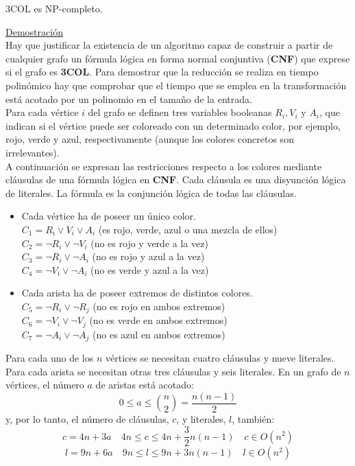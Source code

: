 \begin{fondo}
3COL es NP-completo.
\end{fondo}

\underline{Demostración}\\

Hay que justificar la existencia de un algoritmo capaz de construir a partir de cualquier grafo un fórmula lógica en forma normal conjuntiva (\textbf{CNF}) que exprese si el grafo es \textbf{3COL}. Para demostrar que la reducción se realiza en tiempo polinómico hay que comprobar que el tiempo que se emplea en la transformación está acotado por un polinomio en el tamaño de la entrada.\\

Para cada vértice $i$ del grafo se definen tres variables booleanas $R_i, V_i$ y $A_i$, que indican si el vértice puede ser coloreado con un determinado color, por ejemplo, rojo, verde y azul, respectivamente (aunque los colores concretos son irrelevantes).\\

A continuación se expresan las restricciones respecto a los colores mediante cláusulas de una fórmula lógica en \textbf{CNF}. Cada cláusula es una disyunción lógica de literales. La fórmula es la conjunción lógica de todas las cláusulas.\\

\begin{itemize}
\item Cada vértice ha de poseer un único color.\\
$C_1 = R_i \lor V_i \lor A_i$ (es rojo, verde, azul o una mezcla de ellos)\\
$C_2 = \neg R_i \lor \neg V_i$ (no es rojo y verde a la vez)\\
$C_3 = \neg R_i \lor \neg A_i$ (no es rojo y azul a la vez)\\
$C_4 = \neg V_i \lor \neg A_i$ (no es verde y azul a la vez)\\
\item Cada arista ha de poseer extremos de distintos colores.\\
$C_5 = \neg R_i \lor \neg R_j$ (no es rojo en ambos extremos)\\
$C_6 = \neg V_i \lor \neg V_j$ (no es verde en ambos extremos)\\
$C_7 = \neg A_i \lor \neg A_j$ (no es azul en ambos extremos)
\end{itemize}

Para cada  uno de los $n$ vértices se necesitan cuatro cláusulas y nueve literales. Para cada arista se necesitan otras tres cláusulas y seis literales. En un grafo de $n$ vértices, el número $a$ de aristas está acotado:
\[ 0 \leq a \leq {n\choose 2} = \frac{n(n-1)}{2} \]
y, por lo tanto, el número de cláusulas, $c$, y literales, $l$, también:
\[c = 4n + 3a \quad 4n \leq c \leq 4n + \frac{3}{2} n(n-1) \quad c \in O(n^2) \]
\[l = 9n + 6a \quad 9n \leq l \leq 9n + 3n(n-1) \quad l \in O(n^2) \]

